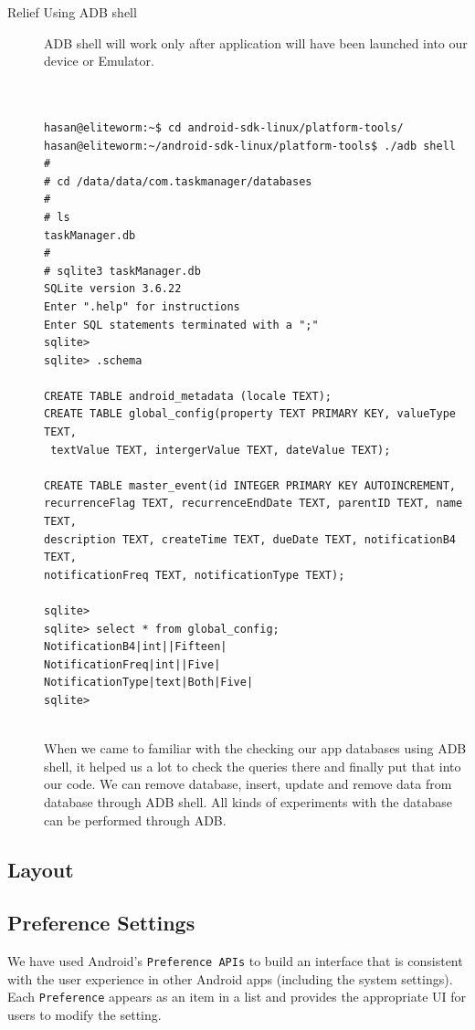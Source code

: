 \documentclass[10pt,a4paper]{report}
\begin{document}
\begin{description}
\item[Relief Using ADB shell]  ADB shell will work only after application will have been launched into our device or Emulator.
 
 \begin{verbatim}
 

hasan@eliteworm:~$ cd android-sdk-linux/platform-tools/
hasan@eliteworm:~/android-sdk-linux/platform-tools$ ./adb shell
# 
# cd /data/data/com.taskmanager/databases
#
# ls
taskManager.db
# 
# sqlite3 taskManager.db
SQLite version 3.6.22
Enter ".help" for instructions
Enter SQL statements terminated with a ";"
sqlite> 
sqlite> .schema

CREATE TABLE android_metadata (locale TEXT);
CREATE TABLE global_config(property TEXT PRIMARY KEY, valueType TEXT,
 textValue TEXT, intergerValue TEXT, dateValue TEXT);

CREATE TABLE master_event(id INTEGER PRIMARY KEY AUTOINCREMENT, 
recurrenceFlag TEXT, recurrenceEndDate TEXT, parentID TEXT, name TEXT, 
description TEXT, createTime TEXT, dueDate TEXT, notificationB4 TEXT, 
notificationFreq TEXT, notificationType TEXT);

sqlite> 
sqlite> select * from global_config;
NotificationB4|int||Fifteen|
NotificationFreq|int||Five|
NotificationType|text|Both|Five|
sqlite> 


 \end{verbatim}
 
 When we came to familiar with the checking our app databases using ADB shell, it helped us a lot to check the queries there and finally put that into our code. We can remove database, insert, update and remove data from database through ADB shell. All kinds of experiments with the database can be performed through ADB.


\end{description}

\subsection{Layout}

\subsection{Preference Settings}

We have used Android's \texttt{Preference APIs} to build an interface that is consistent with the user experience in other Android apps (including the system settings). Each \texttt{Preference} appears as an item in a list and provides the appropriate UI for users to modify the setting. \\
\end{document}
